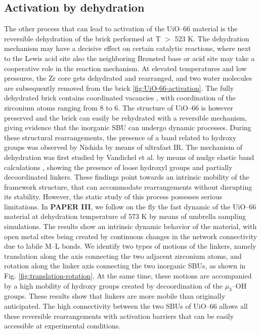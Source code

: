 \subsection{Activation by dehydration}
The other process that can lead to activation of the UiO--66 material is the reversible dehydration of the brick performed at T $>$ 523 K.  The dehydration mechanism may have a decisive effect on certain catalytic reactions, where next to the Lewis acid site also the neighboring Br\o{}nsted base or acid site may take a cooperative role in the reaction mechanism. At elevated temperatures and low pressures, the Zr core gets dehydrated and rearranged, and two water molecules are subsequently removed from the brick \ref{fig:UiO-66-activation}. The fully dehydrated  brick contains coordinated vacancies \cite{valenzano2011disclosing, decoste2013stability, shearer2013situ, vandichel2015active}, with coordination of the zirconium atoms ranging from 8 to 6. The structure of UiO--66 is however preserved and the brick can easily be rehydrated with a reversible mechanism, giving evidence that the inorganic SBU can undergo dynamic processes. During these structural rearrangements, the presence of a band related to hydroxy groups was observed by Nishida by means of ultrafast IR\cite{nishida2014structural}. The mechanism of dehydration was first studied by Vandichel et al. by means of nudge elastic band calculations \cite{vandichel2016water}, showing the presence of loose hydroxyl groups and partially decoordinated linkers. These findings point towards an intrinsic mobility of the framework structure, that can accommodate rearrangements without disrupting its stability. However, the static study of this process possesses serious limitations. In \textbf{PAPER III}, we follow on the fly the fast dynamic of the UiO--66 material at dehydration temperature of 573 K by means of umbrella sampling simulations.  The results show an intrinsic dynamic behavior of the material, with open metal sites being created by continuous changes in the network connectivity due to labile M--L bonds. We identify two types of motions of the linkers, namely translation along the axis connecting the two adjacent zirconium atoms, and rotation along the linker axis connecting the two inorganic SBUs, as shown in Fig. \ref{fig:translation-rotation}. At the same time, these motions are accompanied by a high mobility of hydroxy groups created by decoordination of the $\mu_3$--OH groups. These results show that linkers are more mobile than originally anticipated. The high connectivity between the two SBUs of UiO--66 allows all these reversible rearrangements with activation barriers that can be easily accessible at experimental conditions. 
